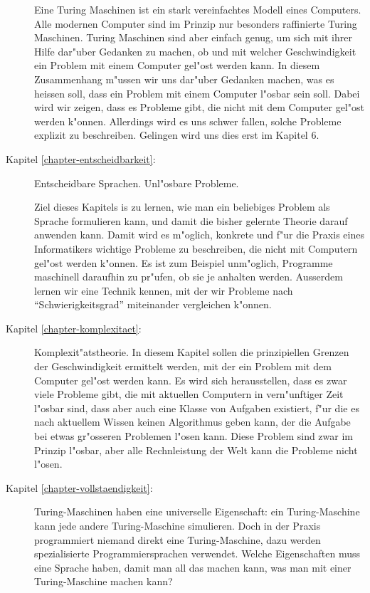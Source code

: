 \begin{description}
Eine Turing Maschinen ist ein stark vereinfachtes Modell eines Computers.
Alle modernen Computer sind im Prinzip nur besonders raffinierte Turing Maschinen.
Turing Maschinen sind aber einfach genug, um sich mit ihrer Hilfe dar"uber Gedanken
zu machen, ob und mit welcher Geschwindigkeit ein Problem mit einem
Computer gel"ost werden kann. In diesem Zusammenhang m"ussen wir uns
dar"uber Gedanken machen, was es heissen soll, dass ein Problem mit
einem Computer l"osbar sein soll. Dabei wird wir zeigen, dass es Probleme
gibt, die nicht mit dem Computer gel"ost werden k"onnen. Allerdings wird
es uns schwer fallen, solche Probleme explizit zu beschreiben. 
Gelingen wird uns dies erst im Kapitel 6.

\item[Kapitel \ref{chapter-entscheidbarkeit}:] Entscheidbare Sprachen. Unl"osbare Probleme.

Ziel dieses Kapitels is zu lernen, wie man ein beliebiges Problem als
Sprache formulieren kann, und damit die bisher gelernte Theorie darauf
anwenden kann. Damit wird es m"oglich, konkrete und f"ur die Praxis eines
Informatikers wichtige Probleme zu beschreiben, die
nicht mit Computern gel"ost werden k"onnen.
Es ist zum Beispiel unm"oglich, Programme maschinell daraufhin
zu pr"ufen, ob sie je anhalten werden.
Ausserdem lernen wir eine Technik kennen, mit der wir Probleme 
nach ``Schwierigkeitsgrad'' miteinander vergleichen k"onnen. 

\item[Kapitel \ref{chapter-komplexitaet}:] Komplexit"atstheorie. In diesem Kapitel sollen 
die prinzipiellen Grenzen der Geschwindigkeit ermittelt werden,
mit der ein Problem mit dem Computer gel"ost werden kann. Es wird sich
herausstellen, dass es zwar viele Probleme gibt, die mit aktuellen Computern in
vern"unftiger Zeit l"osbar sind, dass aber auch eine Klasse von Aufgaben
existiert, f"ur die es nach aktuellem Wissen keinen Algorithmus geben kann,
der die Aufgabe bei etwas gr"osseren Problemen l"osen kann. Diese Problem sind
zwar im Prinzip l"osbar, aber alle Rechnleistung der Welt kann die Probleme nicht l"osen.

\item[Kapitel \ref{chapter-vollstaendigkeit}:]
Turing-Maschinen haben eine universelle Eigenschaft: ein Turing-Maschine
kann jede andere Turing-Maschine simulieren. Doch in der Praxis
programmiert niemand direkt eine Turing-Maschine, dazu werden
spezialisierte Programmiersprachen verwendet.
Welche Eigenschaften muss eine Sprache haben, damit
man all das machen kann, was man mit einer Turing-Maschine
machen kann?
\end{description}


